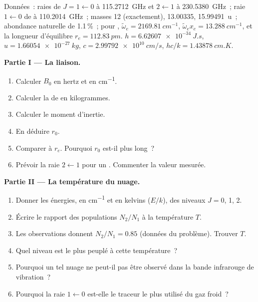 \begin{problem}
\label{pb:b3:rovibrational-spectroscopy:1}
Données~: raies de  $J = 1 \leftarrow 0$ à \qty{115.2712}{GHz} et $2
\leftarrow 1$ à \qty{230.5380}{GHz}~; raie $1 \leftarrow 0$ de
 à
\qty{110.2014}{GHz}~; masses  12 (exactement),  13.00335,
 \qty{15.99491}{u}~; abondance naturelle de 
1.1\,\%~; pour ,
$\tilde\omega_e = \qty{2169.81}{cm^{-1}}$, $\tilde\omega_ex_e = \qty{13.288}{cm^{-1}}$, et
la longueur d'équilibre $r_e = \qty{112.83}{pm}$. $h = \qty{6.62607e-34}{J.s}$, $u =
\qty{1.66054e-27}{kg}$, $c = \qty{2.99792e10}{cm/s}$, $hc/k = \qty{1.43878}{cm.K}$.

\medskip\noindent\textbf{Partie I --- La liaison.}
\begin{enumerate}
  \item Calculer $B_0$ en hertz et en \unit{cm^{-1}}.
  \item Calculer la  de  en kilogrammes.
  \item Calculer le moment d'inertie.
  \item En déduire $r_0$.
  \item Comparer à $r_e$. Pourquoi $r_0$ est-il plus long~?
  \item Prévoir la raie $2 \leftarrow 1$ pour un .
        Commenter la valeur mesurée.
\end{enumerate}

\medskip\noindent\textbf{Partie II --- La température du nuage.}
\begin{enumerate}[resume]
  \item Donner les énergies, en \unit{cm^{-1}} et en kelvins ($E/k$), des
        niveaux $J =
        0$, 1, 2.
  \item Écrire le rapport des populations $N_2/N_1$ à la température $T$.
  \item Les observations donnent $N_2/N_1 = 0.85$ (données du problème).
        Trouver $T$.
  \item Quel niveau est le plus peuplé à cette température~?
  \item Pourquoi un tel nuage ne peut-il pas être observé dans la bande
        infrarouge de vibration~?
  \item Pourquoi la raie $1 \leftarrow 0$ est-elle le traceur le plus
        utilisé du gaz froid~?
\end{enumerate}


\end{problem}
